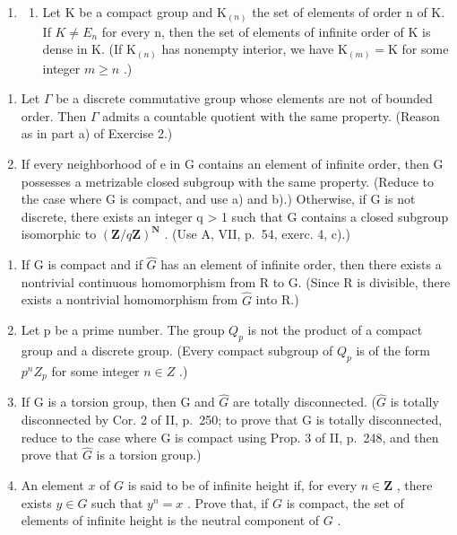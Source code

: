 \begin{enumerate}
\def\labelenumi{\arabic{enumi})}
\setcounter{enumi}{2}
\tightlist
\item
  \begin{enumerate}
  \def\labelenumii{\alph{enumii})}
  \tightlist
  \item
    Let K be a compact group and \(\mathrm{K}_{(n)}\) the set of elements of order n of K. If \(K \neq E_{n}\) for every n, then the set of elements of infinite order of K is dense in K. (If \(\mathrm{K}_{(n)}\) has nonempty interior, we have \(\mathrm{K}_{(m)} = \mathrm{K}\) for some integer \(m \geqslant n\) .)
  \end{enumerate}
\end{enumerate}

\begin{enumerate}
\def\labelenumi{\alph{enumi})}
\setcounter{enumi}{1}
\item
  Let \(\Gamma\) be a discrete commutative group whose elements are not of bounded order. Then \(\Gamma\) admits a countable quotient with the same property. (Reason as in part a) of Exercise 2.)
\item
  If every neighborhood of e in G contains an element of infinite order, then G possesses a metrizable closed subgroup with the same property. (Reduce to the case where G is compact, and use a) and b).) Otherwise, if G is not discrete, there exists an integer q \textgreater{} 1 such that G contains a closed subgroup isomorphic to \((\mathbf{Z}/q\mathbf{Z})^{\mathbf{N}}\) . (Use A, VII, p.~54, exerc. 4, c).)
\end{enumerate}

\begin{enumerate}
\def\labelenumi{\arabic{enumi})}
\setcounter{enumi}{3}
\item
  If G is compact and if \(\widehat{G}\) has an element of infinite order, then there exists a nontrivial continuous homomorphism from R to G. (Since R is divisible, there exists a nontrivial homomorphism from \(\widehat{G}\) into R.)
\item
  Let p be a prime number. The group \(Q_{p}\) is not the product of a compact group and a discrete group. (Every compact subgroup of \(Q_{p}\) is of the form \(p^{n}Z_{p}\) for some integer \(n \in Z\) .)
\item
  If G is a torsion group, then G and \(\widehat{G}\) are totally disconnected. (\(\widehat{G}\) is totally disconnected by Cor. 2 of II, p.~250; to prove that G is totally disconnected, reduce to the case where G is compact using Prop. 3 of II, p.~248, and then prove that \(\widehat{G}\) is a torsion group.)
\item
  An element \(x\) of \(G\) is said to be of infinite height if, for every \(n \in \mathbf{Z}\) , there exists \(y \in G\) such that \(y^n = x\) . Prove that, if \(G\) is compact, the set of elements of infinite height is the neutral component of \(G\) .
\end{enumerate}

